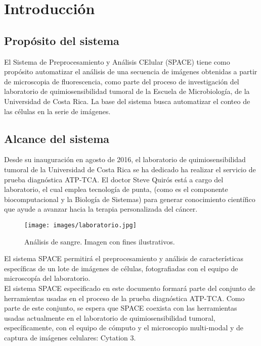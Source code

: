 \documentclass{scrreprt}
\begin{document}

\chapter{Introducción}

\section{Propósito del sistema}
El Sistema de Preprocesamiento y Análisis CElular (SPACE) tiene como propósito automatizar el análisis de una secuencia de imágenes obtenidas a partir de microscopia de fluorescencia, como parte del proceso de investigación del laboratorio de quimiosensibilidad tumoral de la Escuela de Microbiología, de la Universidad de Costa Rica. La base del sistema busca automatizar el conteo de las células en la serie de imágenes.

\section{Alcance del sistema}
Desde su inauguración en agosto de 2016, el laboratorio de quimiosensibilidad tumoral de la Universidad de Costa Rica se ha dedicado ha realizar el servicio de prueba diagnóstica ATP-TCA. El doctor Steve Quirós está a cargo del laboratorio, el cual emplea tecnología de punta, (como es el componente biocomputacional y la Biología de Sistemas) para generar conocimiento científico que ayude a avanzar hacia la terapia personalizada del cáncer.\\

\begin{figure}[H]
	\centering
    \texttt{[image: images/laboratorio.jpg]}
    \caption{Análisis de sangre. Imagen con fines ilustrativos.}\label{imagenLab}
\end{figure}

El sistema SPACE permitirá el preprocesamiento y análisis de características específicas de un lote de imágenes de células, fotografiadas con el equipo de microscopía del laboratorio.\\

El sistema SPACE especificado en este documento formará parte del conjunto de herramientas usadas en el proceso de la prueba diagnóstica ATP-TCA. Como parte de este conjunto, se espera que SPACE coexista con las herramientas usadas actualmente en el laboratorio de quimiosensibilidad tumoral, específicamente, con el equipo de cómputo y el microscopio multi-modal y de captura de imágenes celulares: Cytation 3.
\end{document}
